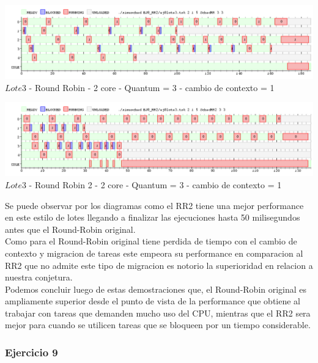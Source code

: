    \begin{center}
    	\includegraphics[width=450pt]{./EJ8_RR2/dif5corerr.png}
	{$Lote 3$ - Round Robin - 2 core - Quantum = 3 - cambio de contexto = 1}	
 \end{center}
 
 \begin{center}
    	\includegraphics[width=450pt]{./EJ8_RR2/dif5corerr2.png}
	{$Lote 3$ - Round Robin 2 - 2 core - Quantum = 3 - cambio de contexto = 1}	
 \end{center}

 Se puede observar por los diagramas como el RR2 tiene una mejor performance en este estilo
 de lotes llegando a finalizar las ejecuciones hasta 50 milisegundos antes que el Round-Robin
 original.\\
 Como para el Round-Robin original tiene perdida de tiempo con el cambio de contexto y
 migracion de tareas este empeora su performance en comparacion al RR2 que no admite
 este tipo de migracion es notorio la superioridad en relacion a nuestra conjetura.\\
 
 Podemos concluir luego de estas demostraciones que, el Round-Robin original es ampliamente
 superior desde el punto de vista de la performance que obtiene al trabajar con tareas
 que demanden mucho uso del CPU, mientras que el RR2 sera mejor para cuando se utilicen
 tareas que se bloqueen por un tiempo considerable.\\
 
 


  
\subsubsection[Resolución Ejercicio 9]{Ejercicio 9}

